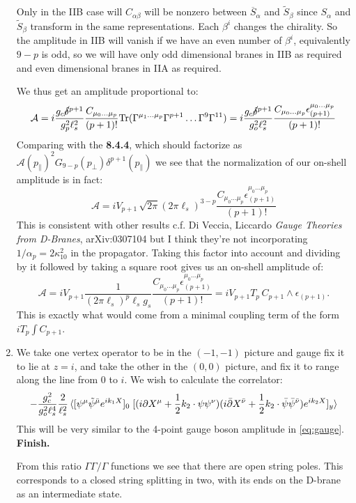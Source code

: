 \documentclass[11pt, class=article, crop=false]{standalone}
\begin{document}
\begin{enumerate}
	Only in the IIB case will $C_{\alpha \beta}$ will be nonzero between $\overline{S}_\alpha$ and $\tilde S_\beta$ since $S_\alpha$ and $\tilde S_\beta$ transform in the same representations. Each $\beta^i$ changes the chirality. So the amplitude in IIB will vanish if we have an even number of $\beta^i$, equivalently $9-p$ is odd, so we will have only odd dimensional branes in IIB as required and even dimensional branes in IIA as required. 
	
	We thus get an amplitude proportional to:
	\[
		\mathcal A = i \frac{g_c \cancel\delta^{p+1}}{g_p^2 \ell_s^2} \frac{C_{\mu_0 \dots \mu_p}}{(p+1)!} \mathrm{Tr}(\Gamma^{\mu_1 \dots \mu_p} \Gamma^{p+1} \dots \Gamma^9 \Gamma^{11}) = i \frac{g_c \cancel\delta^{p+1}}{g_o^2 \ell_s^2} \frac{C_{\mu_0 \dots \mu_p} \epsilon_{(p+1)}^{\mu_0 \dots \mu_p}}{(p+1)!} 
	\]
	Comparing with the \textbf{8.4.4}, which should factorize as $\mathcal A(p_\parallel)^2 G_{9-p}(p_\perp) \delta^{p+1}(p_\parallel)$ we see that the normalization of our on-shell amplitude is in fact:
	\[
		\mathcal A = i V_{p+1} \, \sqrt{2 \pi} (2\pi \ell_s)^{3-p} \frac{C_{\mu_0 \dots \mu_p} \epsilon_{(p+1)}^{\mu_0 \dots \mu_p}}{(p+1)!} 
	\]
	This is consistent with other results c.f. Di Veccia, Liccardo \emph{Gauge Theories from D-Branes}, arXiv:0307104 but I think they're not incorporating $1/\alpha_p = 2 \kappa_{10}^2$ in the propagator. Taking this factor into account and dividing by it followed by taking a square root gives us an on-shell amplitude of:
	\[
		\mathcal A = i V_{p+1} \frac{1}{(2 \pi \ell_s)^p \ell_s g_s} \frac{C_{\mu_0 \dots \mu_p} \epsilon_{(p+1)}^{\mu_0 \dots \mu_p}}{(p+1)!}  = i V_{p+1} T_p \, C_{p+1} \wedge \epsilon_{(p+1)}.
	\]
	This is exactly what would come from a minimal coupling term of the form $i T_p \int C_{p+1}$.
	
	\item We take one vertex operator to be in the $(-1, -1)$ picture and gauge fix it to lie at $z=i$, and take the other in the $(0, 0)$ picture, and fix it to range along the line from $0$ to $i$. We wish to calculate the correlator:
	\[
		-\frac{g_c^2}{g_o^2 \ell_s^4} \frac{2}{\ell_s^2} \braket{[\psi^\mu \tilde \psi^{\bar \mu} e^{i k_1 X}]_0\; [(i \partial X^\mu + \frac12 k_2 \cdot \psi \psi^\nu) (i \bar {\partial} X^{\bar \nu} + \frac12 k_2 \cdot \bar \psi \bar \psi^{\bar \nu}) e^{i k_2 X}]_y }
	\]
	This will be very similar to the 4-point gauge boson amplitude in \eqref{eq:gauge}. \textbf{Finish.}
	
	
	From this ratio $\Gamma \Gamma/\Gamma$ functions we see that there are open string poles. This corresponds to a closed string splitting in two, with its ends on the D-brane as an intermediate state.
	

\end{enumerate}
\end{document}
